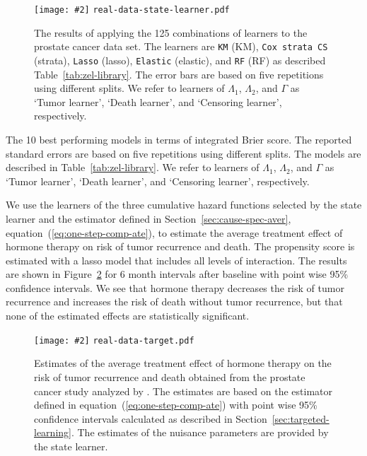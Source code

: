 \documentclass[numsec,webpdf,contemporary,medium,namedate]{oup-authoring-template}%
\theoremstyle{thmstyleone}%
\theoremstyle{thmstyletwo}%
\theoremstyle{thmstylethree}%
\newcommand{\includeFigCond}[2][]{
  \ifx\nofig\undefined %
    \texttt{[image: \#2]} %
  \else %
    \texttt{#2} %
  \fi %
}
\newcommand{\1}{\mathds{1}}
\begin{document}
\begin{figure}
  \centering %
  \includeFigCond[width=.9\linewidth]{real-data-state-learner.pdf}
  \caption[]{The results of applying the 125 combinations of learners to the
    prostate cancer data set. The learners are \texttt{KM} (KM), \texttt{Cox
      strata CS} (strata), \texttt{Lasso} (lasso), \texttt{Elastic} (elastic),
    and \texttt{RF} (RF) as described Table~\ref{tab:zel-library}. The error
    bars are based on five repetitions using different splits. We refer to
    learners of \( \Lambda_1 \), \( \Lambda_2 \), and $\Gamma$ as `Tumor
    learner', `Death learner', and `Censoring learner', respectively.}
  \label{fig:zelefski-real}
\end{figure}


\begin{table}
  \caption{\label{tab:zelefski-real}The 10 best performing models in terms of integrated Brier score. The
    reported standard errors are based on five repetitions using different
    splits. The models are described in Table~\ref{tab:zel-library}. We refer to
    learners of \( \Lambda_1 \), \( \Lambda_2 \), and $\Gamma$ as `Tumor
    learner', `Death learner', and `Censoring learner', respectively.}
  \centering
  
\end{table}


We use the learners of the three cumulative hazard functions selected
by the state learner and the estimator defined in
Section~\ref{sec:cause-spec-aver},
equation~(\ref{eq:one-step-comp-ate}), to estimate the average
treatment effect of hormone therapy on risk of tumor recurrence and
death. The propensity score is estimated with a lasso model that
includes all levels of interaction.
The results are shown in Figure~\ref{fig:zelefski-real-target} for 6
month intervals after baseline with point wise 95\% confidence
intervals. We see that hormone therapy decreases the risk of tumor
recurrence and increases the risk of death without tumor recurrence,
but that none of the estimated effects are statistically significant.

\begin{figure}
  \centering%
  \includeFigCond[width=.8\linewidth]{real-data-target.pdf}
  \caption[]{Estimates of the average treatment effect of hormone therapy on the
    risk of tumor recurrence and death obtained from the prostate cancer study
    analyzed by \cite{kattan2000pretreatment}. The estimates are based on the
    estimator defined in equation~(\ref{eq:one-step-comp-ate}) with point wise
    95\% confidence intervals calculated as described in
    Section~\ref{sec:targeted-learning}. The estimates of the nuisance
    parameters are provided by the state learner.}
  \label{fig:zelefski-real-target}
\end{figure}
\end{document}
